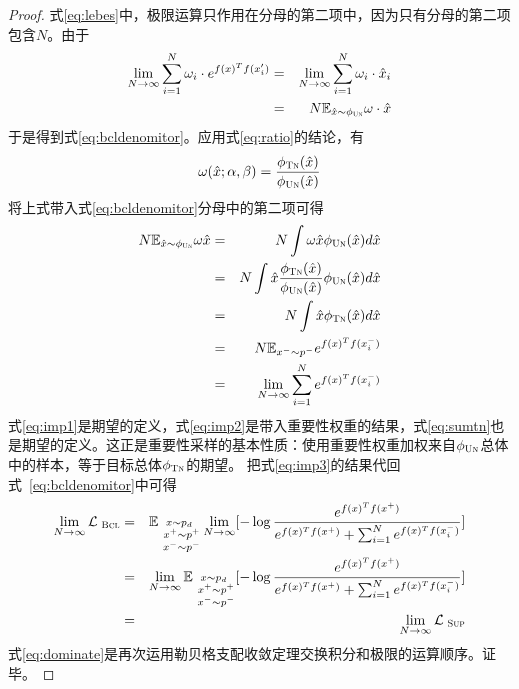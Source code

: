 \begin{theorem}[渐进一致估计]
\begin{proof}
式\eqref{eq:lebes}中，极限运算只作用在分母的第二项中，因为只有分母的第二项包含$N$。由于
\begin{eqnarray}
\lim_{N\rightarrow \infty} \sum_{i=1}^N  \omega_i\cdot e^{f(x)^Tf(x^\prime_i)} &=& \lim_{N\rightarrow \infty} \sum_{i=1}^N  \omega_i\cdot \hat x_i \nonumber \\
&=&  N\mathbb{E}_{\hat{x} \sim \phi_{\textsc{Un}} } \omega \cdot \hat x \nonumber
\end{eqnarray}
于是得到式\eqref{eq:bcldenomitor}。应用式\eqref{eq:ratio}的结论，有
\[\omega(\hat x;\alpha, \beta) = \frac{\phi_\textsc{Tn}(\hat{x})}{\phi_{\textsc{Un}}(\hat{x})}
\]
将上式带入式\eqref{eq:bcldenomitor}分母中的第二项可得
\begin{eqnarray}
	N\mathbb{E}_ {\hat{x} \sim \phi_{\textsc{Un}}} \omega \hat{x} &=& N\int \omega \hat{x}\phi_{\textsc{Un}}(\hat{x}) d\hat{x} \label{eq:imp1}\\
	&=& N\int \hat{x} \frac{\phi_\textsc{Tn}(\hat{x})}{\phi_{\textsc{Un}}(\hat{x})}  \phi_{\textsc{Un}}(\hat{x}) d\hat{x} \label{eq:imp2} \\
	&=& N\int  \hat{x}\phi_\textsc{Tn}(\hat{x})d\hat{x} \nonumber\\
	&=& N \mathbb{E}_ {x^-\sim p^-} e^{f(x)^Tf(x_i^-)}\label{eq:sumtn}\\
	&=& \lim_{N\rightarrow \infty} \sum_{i=1}^Ne^{f(x)^Tf(x_i^-)} \label{eq:imp3}
\end{eqnarray}
式\eqref{eq:imp1}是期望的定义，式\eqref{eq:imp2}是带入重要性权重的结果，式\eqref{eq:sumtn}也是期望的定义。这正是重要性采样的基本性质：使用重要性权重加权来自$\phi_{\textsc{Un}}$总体中的样本，等于目标总体$\phi_{\textsc{Tn}}$的期望。
把式\eqref{eq:imp3}的结果代回式~\eqref{eq:bcldenomitor}中可得
\begin{eqnarray}
	\lim_{N\rightarrow \infty} \mathcal{L}_\textsc{~Bcl} &=&  \mathbb E_{\substack{x \sim p_d\\~x^+ \sim p^+\\~x^- \sim p^-} }	\lim_{N\rightarrow \infty}[-\log \frac{e^{f(x)^Tf(x^+)}}{e^{f(x)^Tf(x^+)} + \sum_{i=1}^Ne^{f(x)^Tf(x_i^-)}}] \nonumber\\
	&=& \lim_{N\rightarrow \infty} \mathbb E_{\substack{x \sim p_d\\~x^+ \sim p^+\\~x^- \sim p^-} }	[-\log \frac{e^{f(x)^Tf(x^+)}}{e^{f(x)^Tf(x^+)} +  \sum_{i=1}^Ne^{f(x)^Tf(x_i^-)} }] \label{eq:dominate}\\
	&=& \lim_{N\rightarrow \infty} \mathcal{L}_\textsc{~Sup}
\end{eqnarray}
式\eqref{eq:dominate}是再次运用勒贝格支配收敛定理交换积分和极限的运算顺序。证毕。
	\end{proof}
\end{theorem}

